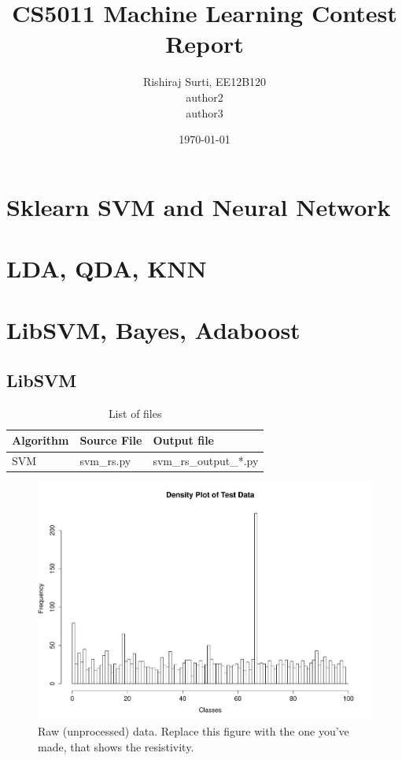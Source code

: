\documentclass[a4paper]{article}
\title{CS5011 Machine Learning Contest Report}
\author{Rishiraj Surti, EE12B120\\
	author2\\
	author3\\}
\date{\today}
\begin{document}
\maketitle

\section{Sklearn SVM and Neural Network}

\section{LDA, QDA, KNN}

\section{LibSVM, Bayes, Adaboost}
\subsection{LibSVM}

\begin{table}
\centering
\begin{tabular}{l|l|l}
Algorithm & Source File & Output file \\\hline
SVM & svm\_rs.py & svm\_rs\_output\_*.py \\

\end{tabular}
\caption{\label{tab:widgets}List of files}
\end{table}




\begin{figure}
\centering
\includegraphics[width=1\textwidth]{../plots/TestData_targets.pdf}
\caption{\label{fig:data}Raw (unprocessed) data. Replace this figure with the one you've made, that shows the resistivity.}
\end{figure}
\end{document}
